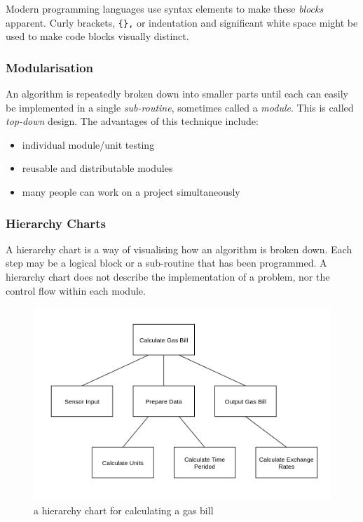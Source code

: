 \documentclass[9pt]{article}
\begin{document}
Modern programming languages use syntax elements to make these \emph{blocks} apparent. Curly brackets, \texttt{\{\},} or indentation and significant white space might be used to make code blocks visually distinct.

\subsubsection{Modularisation}
\label{sec:orgccb8925}

An algorithm is repeatedly broken down into smaller parts until each can easily be implemented in a single \emph{sub-routine}, sometimes called a \emph{module}. This is called \emph{top-down} design. The advantages of this technique include:

\begin{itemize}
\item individual module/unit testing
\item reusable and distributable modules
\item many people can work on a project simultaneously
\end{itemize}

\subsubsection{Hierarchy Charts}
\label{sec:org0359b86}

A hierarchy chart is a way of visualising how an algorithm is broken down. Each step may be a logical block or a sub-routine that has been programmed. A hierarchy chart does not describe the implementation of a problem, nor the control flow within each module.

\begin{figure}[htbp]
\centering
\includegraphics[width=.9\linewidth]{./images/heirarchy.png}
\caption{a hierarchy chart for calculating a gas bill}
\end{figure}
\end{document}
